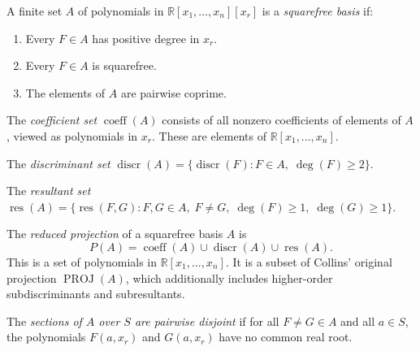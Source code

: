 \begin{definition}
  \label{def:IsSquarefreeBasis}
  \leanok
  A finite set $A$ of polynomials in $\mathbb{R}[x_1,\ldots,x_n][x_r]$ is a
  \emph{squarefree basis} if:
  \begin{enumerate}
    \item Every $F \in A$ has positive degree in $x_r$.
    \item Every $F \in A$ is squarefree.
    \item The elements of $A$ are pairwise coprime.
  \end{enumerate}
\end{definition}

\begin{definition}
  \label{def:coeffSet}
  \leanok
  The \emph{coefficient set} $\operatorname{coeff}(A)$ consists of all nonzero
  coefficients of elements of $A$, viewed as polynomials in $x_r$.  These are
  elements of $\mathbb{R}[x_1,\ldots,x_n]$.
\end{definition}

\begin{definition}
  \label{def:discrSet}
  \leanok
  The \emph{discriminant set} $\operatorname{discr}(A) = \{ \operatorname{discr}(F) : F \in A,\; \deg(F) \ge 2 \}$.
\end{definition}

\begin{definition}
  \label{def:resSet}
  \leanok
  The \emph{resultant set}
  $\operatorname{res}(A) = \{ \operatorname{res}(F, G) : F, G \in A,\; F \ne G,\;
  \deg(F) \ge 1,\; \deg(G) \ge 1 \}$.
\end{definition}

\begin{definition}
  \label{def:reducedProjection}
  \leanok
  The \emph{reduced projection} of a squarefree basis $A$ is
  \[ P(A) = \operatorname{coeff}(A) \cup \operatorname{discr}(A) \cup \operatorname{res}(A). \]
  This is a set of polynomials in $\mathbb{R}[x_1,\ldots,x_n]$.
  It is a subset of Collins' original projection $\operatorname{PROJ}(A)$,
  which additionally includes higher-order subdiscriminants and subresultants.
\end{definition}

\begin{definition}
  \label{def:SectionsDisjoint}
  \leanok
  The \emph{sections of $A$ over $S$ are pairwise disjoint} if for all
  $F \ne G \in A$ and all $a \in S$, the polynomials $F(a, x_r)$ and
  $G(a, x_r)$ have no common real root.
\end{definition}

